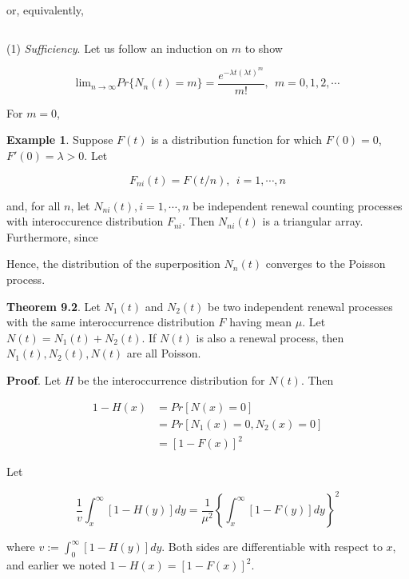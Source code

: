 \documentclass[12pt]{article}
\theoremstyle{nonumberbreak}
\begin{document}
or, equivalently,

$$
\
$$


(1) \textit{Sufficiency}. Let us follow an induction on $m$ to show

$$
\mathrm{lim}_{n\to\infty} Pr \{ N_n(t) = m \} = \frac{e^{-\lambda t (\lambda t)^m}}{m!}, \ \ m=0,1,2,\cdots
$$

For $m=0$, 





\textbf{Example 1}. Suppose $F(t)$ is a distribution function for which $F(0) = 0$, $F'(0) = \lambda >0$. Let

$$
F_{ni}(t) = F(t/n), \ \ i=1,\cdots,n
$$

and, for all $n$, let $N_{ni} (t), i=1,\cdots,n$ be independent renewal counting processes with interoccurence distribution $F_{ni}$. Then $N_{ni} (t)$ is a triangular array. Furthermore, since 




Hence, the distribution of the superposition $N_n(t)$ converges to the Poisson process. 





\begin{theorem}
\textbf{Theorem 9.2}. Let $N_1(t)$ and $N_2(t)$ be two independent renewal processes with the same interoccurrence distribution $F$ having mean $\mu$. Let $N(t) = N_1(t) + N_2(t)$. If $N(t)$ is also a renewal process, then $N_1(t), N_2(t), N(t)$ are all Poisson.
\end{theorem}


\textbf{Proof}. Let $H$ be the interoccurrence distribution for $N(t)$. Then 

$$
\begin{aligned}
1 - H(x) &= Pr[N(x) = 0] \\[8pt]
&= Pr[N_1(x)=0, N_2(x)=0] \\[8pt]
&= [1-F(x)]^2
\end{aligned}
$$

Let 



$$
\frac{1}{v} \int_x^\infty [1-H(y)]dy = \frac{1}{\mu^2} \left\{ \int_x^\infty [1-F(y)] dy \right\}^2
$$

where $v := \int_0^\infty [1-H(y)] dy$. Both sides are differentiable with respect to $x$, and earlier we noted $1-H(x) = [1-F(x)]^2$.  
\end{document}
